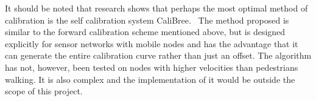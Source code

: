 It should be noted that research shows that perhaps the most optimal method of calibration is the self calibration system CaliBree.~\cite{calibree} The method proposed is similar to the forward calibration scheme mentioned above, but is designed explicitly for sensor networks with mobile nodes and has the advantage that it can generate the entire calibration curve rather than just an offset. The algorithm has not, however, been tested on nodes with higher velocities than pedestrians walking. It is also complex and the implementation of it would be outside the scope of this project. 




